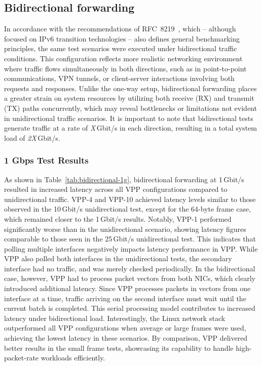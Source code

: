 \subsection{Bidirectional forwarding}

In accordance with the recommendations of RFC~8219~\cite{RFC8219}, which -- although focused on IPv6 transition technologies -- 
also defines general benchmarking principles, the same test scenarios were executed under bidirectional traffic conditions.  
This configuration reflects more realistic networking environment where traffic flows simultaneously in both directions, such as in point-to-point communications,
 VPN tunnels, or client-server interactions involving both requests and responses.  
Unlike the one-way setup, bidirectional forwarding places a greater strain on system resources by utilizing both receive (RX) and transmit (TX) paths concurrently, 
which may reveal bottlenecks or limitations not evident in unidirectional traffic scenarios.
It is important to note that bidirectional tests generate traffic at a rate of \textit{X}\,Gbit/s in each direction, resulting in a total system load of \textit{2X}\,Gbit/s.

\subsubsection{1 Gbps Test Results}

As shown in Table~\ref{tab:bidirectional-1g}, bidirectional forwarding at 1\,Gbit/s resulted in increased latency across all VPP configurations compared to unidirectional traffic. 
VPP-4 and VPP-10 achieved latency levels similar to those observed in the 10\,Gbit/s unidirectional test, except for the 64-byte frame case, which remained closer to the 1\,Gbit/s results.
Notably, VPP-1 performed significantly worse than in the unidirectional scenario, showing latency figures comparable to those seen in the 25\,Gbit/s unidirectional test. 
This indicates that polling multiple interfaces negatively impacts latency performance in VPP.
While VPP also polled both interfaces in the unidirectional tests, the secondary interface had no traffic, and was merely checked periodically. 
In the bidirectional case, however, VPP had to process packet vectors from both NICs, which clearly introduced additional latency. 
Since VPP processes packets in vectors from one interface at a time, traffic arriving on the second interface must wait until the current batch is completed. 
This serial processing model contributes to increased latency under bidirectional load.
Interestingly, the Linux network stack outperformed all VPP configurations when average or large frames were used, achieving the lowest latency in these scenarios. 
By comparison, VPP delivered better results in the small frame tests, showcasing its capability to handle high-packet-rate workloads efficiently.

